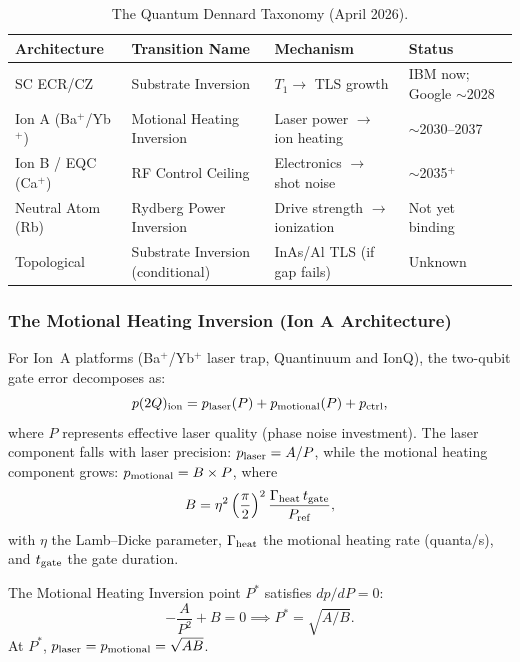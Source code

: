 \documentclass[12pt,a4paper]{article}
\begin{document}
\begin{table}[h]
\centering
\caption{The Quantum Dennard Taxonomy (April 2026).}
\label{tab:dennard_taxonomy}
\begin{tabular}{llll}
\toprule
\textbf{Architecture} & \textbf{Transition Name} & \textbf{Mechanism} & \textbf{Status} \\
\midrule
SC ECR/CZ & Substrate Inversion & $T_1 \to$ TLS growth & IBM now; Google $\sim$2028 \\
Ion A (Ba$^+$/Yb$^+$) & Motional Heating Inversion & Laser power $\to$ ion heating & $\sim$2030--2037 \\
Ion B / EQC (Ca$^+$) & RF Control Ceiling & Electronics $\to$ shot noise & $\sim$2035$^+$ \\
Neutral Atom (Rb) & Rydberg Power Inversion & Drive strength $\to$ ionization & Not yet binding \\
Topological & Substrate Inversion (conditional) & InAs/Al TLS (if gap fails) & Unknown \\
\bottomrule
\end{tabular}
\end{table}

\subsubsection{The Motional Heating Inversion (Ion A Architecture)}
\label{sec:mhi}

For Ion~A platforms (Ba$^+$/Yb$^+$ laser trap, Quantinuum and IonQ),
the two-qubit gate error decomposes as:
\begin{equation}
p(2Q)_{\rm ion} = p_{\rm laser}(P) + p_{\rm motional}(P) + p_{\rm ctrl},
\end{equation}
where $P$ represents effective laser quality (phase noise investment).
The laser component falls with laser precision:
$p_{\rm laser} = A/P$, while the motional heating component grows:
$p_{\rm motional} = B \times P$, where
\begin{equation}
B = \eta^2 \left(\frac{\pi}{2}\right)^2 \frac{\Gamma_{\rm heat}\, t_{\rm gate}}{P_{\rm ref}},
\end{equation}
with $\eta$ the Lamb--Dicke parameter, $\Gamma_{\rm heat}$ the motional
heating rate (quanta/s), and $t_{\rm gate}$ the gate duration.

The Motional Heating Inversion point $P^*$ satisfies $dp/dP = 0$:
\begin{equation}
-\frac{A}{P^2} + B = 0 \implies \boxed{P^* = \sqrt{A/B}}.
\end{equation}
At $P^*$, $p_{\rm laser} = p_{\rm motional} = \sqrt{AB}$.
\end{document}
